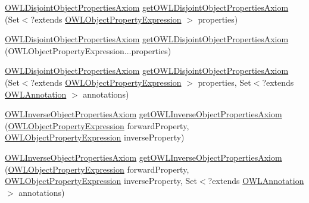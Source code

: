 \begin{DoxyCompactItemize}
\item 
\hyperlink{interfaceorg_1_1semanticweb_1_1owlapi_1_1model_1_1_o_w_l_disjoint_object_properties_axiom}{O\-W\-L\-Disjoint\-Object\-Properties\-Axiom} \hyperlink{interfaceorg_1_1semanticweb_1_1owlapi_1_1model_1_1_o_w_l_data_factory_ad3b592979c988b07e48eda3630f63c34}{get\-O\-W\-L\-Disjoint\-Object\-Properties\-Axiom} (Set$<$?extends \hyperlink{interfaceorg_1_1semanticweb_1_1owlapi_1_1model_1_1_o_w_l_object_property_expression}{O\-W\-L\-Object\-Property\-Expression} $>$ properties)
\item 
\hyperlink{interfaceorg_1_1semanticweb_1_1owlapi_1_1model_1_1_o_w_l_disjoint_object_properties_axiom}{O\-W\-L\-Disjoint\-Object\-Properties\-Axiom} \hyperlink{interfaceorg_1_1semanticweb_1_1owlapi_1_1model_1_1_o_w_l_data_factory_a1efcc51d2ab6464a8b449df58539274d}{get\-O\-W\-L\-Disjoint\-Object\-Properties\-Axiom} (O\-W\-L\-Object\-Property\-Expression...\-properties)
\item 
\hyperlink{interfaceorg_1_1semanticweb_1_1owlapi_1_1model_1_1_o_w_l_disjoint_object_properties_axiom}{O\-W\-L\-Disjoint\-Object\-Properties\-Axiom} \hyperlink{interfaceorg_1_1semanticweb_1_1owlapi_1_1model_1_1_o_w_l_data_factory_aad77da3984e3a6f9bff00c20eb829177}{get\-O\-W\-L\-Disjoint\-Object\-Properties\-Axiom} (Set$<$?extends \hyperlink{interfaceorg_1_1semanticweb_1_1owlapi_1_1model_1_1_o_w_l_object_property_expression}{O\-W\-L\-Object\-Property\-Expression} $>$ properties, Set$<$?extends \hyperlink{interfaceorg_1_1semanticweb_1_1owlapi_1_1model_1_1_o_w_l_annotation}{O\-W\-L\-Annotation} $>$ annotations)
\item 
\hyperlink{interfaceorg_1_1semanticweb_1_1owlapi_1_1model_1_1_o_w_l_inverse_object_properties_axiom}{O\-W\-L\-Inverse\-Object\-Properties\-Axiom} \hyperlink{interfaceorg_1_1semanticweb_1_1owlapi_1_1model_1_1_o_w_l_data_factory_a1f07cd2ee3ea9430ef651d54ddd8918b}{get\-O\-W\-L\-Inverse\-Object\-Properties\-Axiom} (\hyperlink{interfaceorg_1_1semanticweb_1_1owlapi_1_1model_1_1_o_w_l_object_property_expression}{O\-W\-L\-Object\-Property\-Expression} forward\-Property, \hyperlink{interfaceorg_1_1semanticweb_1_1owlapi_1_1model_1_1_o_w_l_object_property_expression}{O\-W\-L\-Object\-Property\-Expression} inverse\-Property)
\item 
\hyperlink{interfaceorg_1_1semanticweb_1_1owlapi_1_1model_1_1_o_w_l_inverse_object_properties_axiom}{O\-W\-L\-Inverse\-Object\-Properties\-Axiom} \hyperlink{interfaceorg_1_1semanticweb_1_1owlapi_1_1model_1_1_o_w_l_data_factory_a6daf7f9b9e42e09f45832e12c7d60536}{get\-O\-W\-L\-Inverse\-Object\-Properties\-Axiom} (\hyperlink{interfaceorg_1_1semanticweb_1_1owlapi_1_1model_1_1_o_w_l_object_property_expression}{O\-W\-L\-Object\-Property\-Expression} forward\-Property, \hyperlink{interfaceorg_1_1semanticweb_1_1owlapi_1_1model_1_1_o_w_l_object_property_expression}{O\-W\-L\-Object\-Property\-Expression} inverse\-Property, Set$<$?extends \hyperlink{interfaceorg_1_1semanticweb_1_1owlapi_1_1model_1_1_o_w_l_annotation}{O\-W\-L\-Annotation} $>$ annotations)

\end{DoxyCompactItemize}
